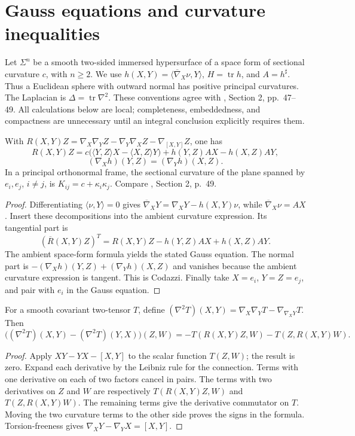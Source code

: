 \chapter{Gauss equations and curvature inequalities}\label{sec:gauss-simons}
Let $\Sigma^n$ be a smooth two-sided immersed hypersurface of a space form of sectional curvature $c$, with $n\geq2$. We use $h(X,Y)=\langle\overline\nabla_X\nu,Y\rangle$, $H=\operatorname{tr}h$, and $A=h^\sharp$. Thus a Euclidean sphere with outward normal has positive principal curvatures. The Laplacian is $\Delta=\operatorname{tr}\nabla^2$. These conventions agree with \cite{HP99}, Section 2, pp.~47--49. All calculations below are local; completeness, embeddedness, and compactness are unnecessary until an integral conclusion explicitly requires them.

\begin{proposition}\label{prop:spaceform-gauss-codazzi}
With $R(X,Y)Z=\nabla_X\nabla_YZ-\nabla_Y\nabla_XZ-\nabla_{[X,Y]}Z$, one has
\[
 R(X,Y)Z=c\bigl(\langle Y,Z\rangle X-\langle X,Z\rangle Y\bigr)
       +h(Y,Z)AX-h(X,Z)AY,
\]
\[
 (\nabla_Xh)(Y,Z)=(\nabla_Yh)(X,Z).
\]
In a principal orthonormal frame, the sectional curvature of the plane spanned by $e_i,e_j$, $i\ne j$, is $K_{ij}=c+\kappa_i\kappa_j$. Compare \cite{HP99}, Section 2, p.~49.
\end{proposition}
\begin{proof}
Differentiating $\langle\nu,Y\rangle=0$ gives
$\overline\nabla_XY=\nabla_XY-h(X,Y)\nu$, while $\overline\nabla_X\nu=AX$. Insert these decompositions into the ambient curvature expression. Its tangential part is
\[
 (\overline R(X,Y)Z)^T=R(X,Y)Z-h(Y,Z)AX+h(X,Z)AY.
\]
The ambient space-form formula yields the stated Gauss equation. The normal part is
$-(\nabla_Xh)(Y,Z)+(\nabla_Yh)(X,Z)$ and vanishes because the ambient curvature expression is tangent. This is Codazzi. Finally take $X=e_i$, $Y=Z=e_j$, and pair with $e_i$ in the Gauss equation.
\end{proof}

\begin{lemma}\label{lem:two-tensor-commutation}
For a smooth covariant two-tensor $T$, define $(\nabla^2T)(X,Y)=\nabla_X\nabla_YT-\nabla_{\nabla_XY}T$. Then
\[
 \bigl((\nabla^2T)(X,Y)-(\nabla^2T)(Y,X)\bigr)(Z,W)
 =-T(R(X,Y)Z,W)-T(Z,R(X,Y)W).
\]
\end{lemma}
\begin{proof}
Apply $XY-YX-[X,Y]$ to the scalar function $T(Z,W)$; the result is zero. Expand each derivative by the Leibniz rule for the connection. Terms with one derivative on each of two factors cancel in pairs. The terms with two derivatives on $Z$ and $W$ are respectively $T(R(X,Y)Z,W)$ and $T(Z,R(X,Y)W)$. The remaining terms give the derivative commutator on $T$. Moving the two curvature terms to the other side proves the signs in the formula. Torsion-freeness gives $\nabla_XY-\nabla_YX=[X,Y]$.
\end{proof}

